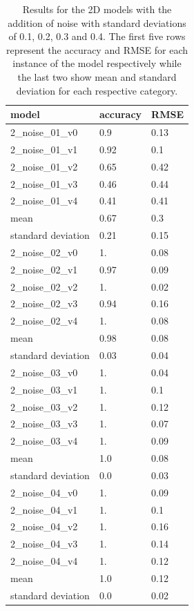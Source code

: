 \begin{table}[!htb]
	\centering
	\caption{Results for the 2D models with the addition of noise with standard deviations of 0.1, 0.2, 0.3 and 0.4. The first five rows represent the accuracy and RMSE for each instance of the model respectively while the last two show mean and standard deviation for each respective category.}
	\begin{tabularx}{\textwidth}{ X  X  X }
		\hline
		model & accuracy & RMSE \\ 
		\hline
		2\_noise\_01\_v0 & 0.9 & 0.13\\
		2\_noise\_01\_v1 & 0.92 & 0.1 \\
		2\_noise\_01\_v2 & 0.65 & 0.42 \\
		2\_noise\_01\_v3 & 0.46 & 0.44 \\
		2\_noise\_01\_v4 & 0.41 & 0.41 \\ 
		\hline
		mean & 0.67 & 0.3 \\
		standard deviation & 0.21 & 0.15 \\
		\hline
		2\_noise\_02\_v0 & 1. &  0.08 \\
		2\_noise\_02\_v1 & 0.97 & 0.09\\
		2\_noise\_02\_v2 & 1.   & 0.02\\
		2\_noise\_02\_v3 & 0.94 & 0.16\\
		2\_noise\_02\_v4 & 1.   & 0.08\\ 
		\hline
		mean & 0.98 & 0.08 \\
		standard deviation & 0.03 & 0.04 \\
		\hline
		2\_noise\_03\_v0 & 1.   & 0.04 \\
		2\_noise\_03\_v1 & 1.   & 0.1 \\
		2\_noise\_03\_v2 & 1.   & 0.12 \\
		2\_noise\_03\_v3 & 1.   & 0.07 \\
		2\_noise\_03\_v4 & 1.   & 0.09 \\ 
		\hline
		mean & 1.0 & 0.08\\
		standard deviation & 0.0 & 0.03\\
		\hline
		2\_noise\_04\_v0 & 1. &  0.09 \\
		2\_noise\_04\_v1 & 1. &  0.1 \\
		2\_noise\_04\_v2 & 1. &  0.16 \\
		2\_noise\_04\_v3 & 1. &  0.14 \\
		2\_noise\_04\_v4 & 1. &  0.12 \\
		\hline
		mean & 1.0 & 0.12 \\
		standard deviation & 0.0 & 0.02 \\
		\hline		
	\end{tabularx}
	\label{table:2_noise}
\end{table}


